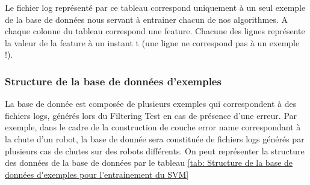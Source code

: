 Le fichier log représenté par ce tableau correspond uniquement à un seul exemple de la base de données nous servant à entrainer chacun de nos algorithmes. 
A chaque colonne du tableau correspond une feature. Chacune des lignes représente la valeur de la feature à un instant t (une ligne ne correspond pas à un exemple !). 

\subsubsection{Structure de la base de données d'exemples}
\label{Automatisation du processus d'investigation: Achitecture High Level du système proposé: Les exemples: Structure de la base de données d'exemples}
La base de donnée est composée de plusieurs exemples qui correspondent à des fichiers logs, générés lors du Filtering Test en cas de présence d'une erreur. Par exemple, dans le cadre de la construction de couche error name correspondant à la chute d'un robot, la base de donnée sera constituée de fichiers logs générés par plusieurs cas de chutes sur des robots différents. On peut représenter la structure des données de la base de données par le tableau \ref {tab: Structure de la base de données d'exemples pour l'entrainement du SVM}

